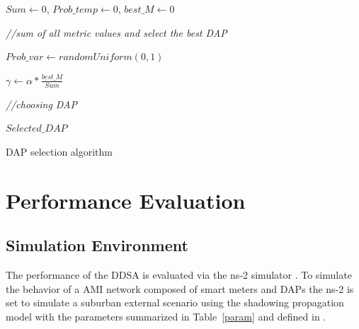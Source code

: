 \documentclass[conference]{IEEEtran}
\begin{document}
\IncMargin{1em}
\begin{algorithm}

$Sum \leftarrow 0$, $Prob\_temp \leftarrow 0$, $best\_M \leftarrow 0$

\emph{//sum of all metric values and select the best DAP }

\BlankLine
$ Prob\_var \leftarrow randomUniform(0,1)$

$\gamma \leftarrow \alpha * \frac {best\_M}{Sum} $

\emph{//choosing DAP }


\KwRet
{$ Selected\_DAP $}

\BlankLine
\caption{DAP selection algorithm}\label{prob}
\end{algorithm}\DecMargin{1em}


\section{Performance Evaluation}




\subsection{Simulation Environment}  

The performance of the DDSA is evaluated via the ns-2 simulator \cite{ns-2:13}. 
To simulate the behavior of a AMI network composed of  smart meters and DAPs the ns-2 is set to simulate a suburban external scenario using the shadowing propagation model with the parameters summarized in Table~\ref{param} and defined in \cite{Plan2011}.
\end{document}
